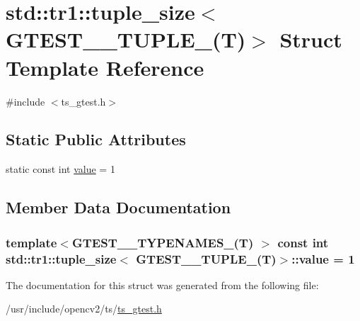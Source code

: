 \hypertarget{structstd_1_1tr1_1_1tuple__size_3_01GTEST__1__TUPLE___07T_08_4}{\section{std\-:\-:tr1\-:\-:tuple\-\_\-size$<$ G\-T\-E\-S\-T\-\_\-\_\-\-T\-U\-P\-L\-E\-\_\-(T)$>$ Struct Template Reference}
\label{structstd_1_1tr1_1_1tuple__size_3_01GTEST__1__TUPLE___07T_08_4}
}


{\ttfamily \#include $<$ts\-\_\-gtest.\-h$>$}

\subsection*{Static Public Attributes}
\begin{DoxyCompactItemize}
\item 
static const int \hyperlink{structstd_1_1tr1_1_1tuple__size_3_01GTEST__1__TUPLE___07T_08_4_abffc29a7e49810bb66be4f12558098c6}{value} = 1
\end{DoxyCompactItemize}


\subsection{Member Data Documentation}
\hypertarget{structstd_1_1tr1_1_1tuple__size_3_01GTEST__1__TUPLE___07T_08_4_abffc29a7e49810bb66be4f12558098c6}{
\subsubsection[{value}]{\setlength{\rightskip}{0pt plus 5cm}template$<$G\-T\-E\-S\-T\-\_\-\_\-\-T\-Y\-P\-E\-N\-A\-M\-E\-S\-\_\-(\-T) $>$ const int {\bf std\-::tr1\-::tuple\-\_\-size}$<$ {\bf G\-T\-E\-S\-T\-\_\-\_\-\-T\-U\-P\-L\-E\-\_\-}({\bf T})$>$\-::value = 1\hspace{0.3cm}{\ttfamily [static]}}}\label{structstd_1_1tr1_1_1tuple__size_3_01GTEST__1__TUPLE___07T_08_4_abffc29a7e49810bb66be4f12558098c6}


The documentation for this struct was generated from the following file\-:\begin{DoxyCompactItemize}
\item 
/usr/include/opencv2/ts/\hyperlink{ts__gtest_8h}{ts\-\_\-gtest.\-h}\end{DoxyCompactItemize}
